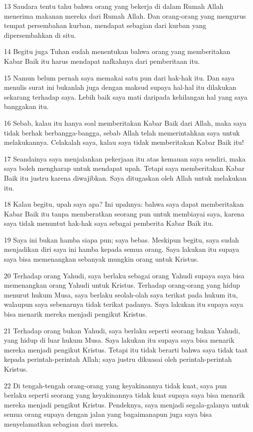 \par 13 Saudara tentu tahu bahwa orang yang bekerja di dalam Rumah Allah menerima makanan mereka dari Rumah Allah. Dan orang-orang yang mengurus tempat persembahan kurban, mendapat sebagian dari kurban yang dipersembahkan di situ.
\par 14 Begitu juga Tuhan sudah menentukan bahwa orang yang memberitakan Kabar Baik itu harus mendapat nafkahnya dari pemberitaan itu.
\par 15 Namun belum pernah saya memakai satu pun dari hak-hak itu. Dan saya menulis surat ini bukanlah juga dengan maksud supaya hal-hal itu dilakukan sekarang terhadap saya. Lebih baik saya mati daripada kehilangan hal yang saya banggakan itu.
\par 16 Sebab, kalau itu hanya soal memberitakan Kabar Baik dari Allah, maka saya tidak berhak berbangga-bangga, sebab Allah telah memerintahkan saya untuk melakukannya. Celakalah saya, kalau saya tidak memberitakan Kabar Baik itu!
\par 17 Seandainya saya menjalankan pekerjaan itu atas kemauan saya sendiri, maka saya boleh mengharap untuk mendapat upah. Tetapi saya memberitakan Kabar Baik itu justru karena diwajibkan. Saya ditugaskan oleh Allah untuk melakukan itu.
\par 18 Kalau begitu, upah saya apa? Ini upahnya: bahwa saya dapat memberitakan Kabar Baik itu tanpa memberatkan seorang pun untuk membiayai saya, karena saya tidak menuntut hak-hak saya sebagai pemberita Kabar Baik itu.
\par 19 Saya ini bukan hamba siapa pun; saya bebas. Meskipun begitu, saya sudah menjadikan diri saya ini hamba kepada semua orang. Saya lakukan itu supaya saya bisa memenangkan sebanyak mungkin orang untuk Kristus.
\par 20 Terhadap orang Yahudi, saya berlaku sebagai orang Yahudi supaya saya bisa memenangkan orang Yahudi untuk Kristus. Terhadap orang-orang yang hidup menurut hukum Musa, saya berlaku seolah-olah saya terikat pada hukum itu, walaupun saya sebenarnya tidak terikat padanya. Saya lakukan itu supaya saya bisa menarik mereka menjadi pengikut Kristus.
\par 21 Terhadap orang bukan Yahudi, saya berlaku seperti seorang bukan Yahudi, yang hidup di luar hukum Musa. Saya lakukan itu supaya saya bisa menarik mereka menjadi pengikut Kristus. Tetapi itu tidak berarti bahwa saya tidak taat kepada perintah-perintah Allah; saya justru dikuasai oleh perintah-perintah Kristus.
\par 22 Di tengah-tengah orang-orang yang keyakinannya tidak kuat, saya pun berlaku seperti seorang yang keyakinannya tidak kuat supaya saya bisa menarik mereka menjadi pengikut Kristus. Pendeknya, saya menjadi segala-galanya untuk semua orang supaya dengan jalan yang bagaimanapun juga saya bisa menyelamatkan sebagian dari mereka.
